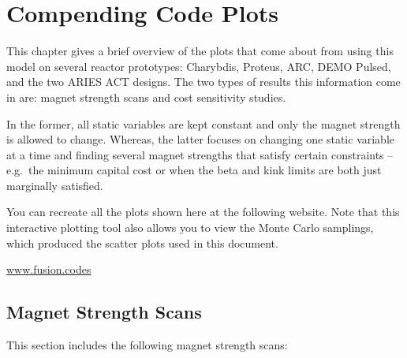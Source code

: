 %
%
%
%
%
%
%
%

\chapter{Compending Code Plots}

\label{chapter:extra}

This chapter gives a brief overview of the plots that come about from using this model on several reactor prototypes: Charybdis, Proteus, ARC, DEMO Pulsed, and the two ARIES ACT designs. The two types of results this information come in are: magnet strength scans and cost sensitivity studies.

In the former, all static variables are kept constant and only the magnet strength is allowed to change. Whereas, the latter focuses on changing one static variable at a time and finding several magnet strengths that satisfy certain constraints -- e.g.\ the minimum capital cost or when the beta and kink limits are both just marginally satisfied.

You can recreate all the plots shown here at the following website. Note that this interactive plotting tool also allows you to view the Monte Carlo samplings, which produced the scatter plots used in this document.

{\centering \href{http://fusion.codes}{www.fusion.codes} \par }

\clearpage

\newpage

\section{Magnet Strength Scans}
\label{section:scans}

This section includes the following magnet strength scans: ~


